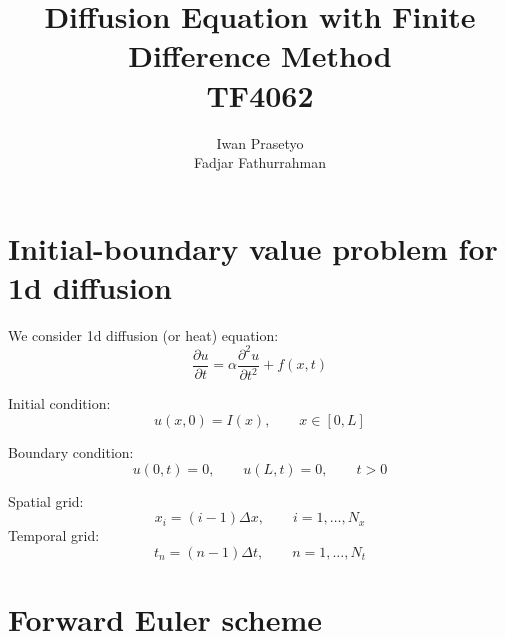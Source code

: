 \documentclass[a4paper,11pt]{article}
\begin{document}
\title{Diffusion Equation with Finite Difference Method \\
TF4062}
\author{Iwan Prasetyo \\
Fadjar Fathurrahman}
\date{}
\maketitle

\section{Initial-boundary value problem for 1d diffusion}

We consider 1d diffusion (or heat) equation:
\begin{equation}
\frac{\partial u}{\partial t} = \alpha \frac{\partial^2 u}{\partial t^2} + f(x,t)
\label{eq:PDE_heat}
\end{equation}

Initial condition:
\begin{equation}
u(x,0) = I(x), \qquad x \in [0,L]
\end{equation}

Boundary condition:
\begin{equation}
u(0,t) = 0, \qquad u(L,t) = 0, \qquad t > 0
\label{eq:bc_dirichlet}
\end{equation}

Spatial grid:
\begin{equation}
x_{i} = (i-1)\Delta x, \qquad i = 1, \ldots, N_{x}
\end{equation}
Temporal grid:
\begin{equation}
t_{n} = (n-1)\Delta t, \qquad n = 1, \ldots, N_{t}
\end{equation}


\section{Forward Euler scheme}
\end{document}
